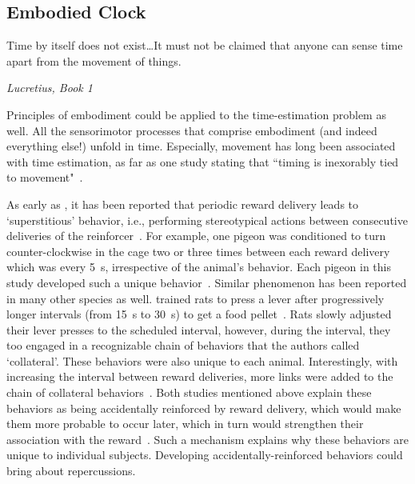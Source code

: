 \subsection{Embodied Clock}
\label{ch:intro:EmbodiedClock}
\epigraph{Time by itself does not exist\ldots It must not be claimed that anyone can sense time apart from the movement of things.}
{\textit{Lucretius, Book 1}}
\noindent
Principles of embodiment could be applied to the time-estimation problem as well.
All the sensorimotor processes that comprise embodiment (and indeed everything else!) unfold in time.
Especially, movement has long been associated with time estimation, as far as one study stating that ``timing is inexorably tied to movement"~\cite{Wiener2019eNeuro}.\footnotemark
{}
\par
As early as \citeyear{Skinner1948}, it has been reported that periodic reward delivery leads to `superstitious' behavior, i.e., performing stereotypical actions between consecutive deliveries of the reinforcer~\cite{Skinner1948}.
For example, one pigeon was conditioned to turn counter-clockwise in the cage two or three times between each reward delivery which was every 5~s, irrespective of the animal's behavior.
Each pigeon in this study developed such a unique behavior~\cite{Skinner1948}.
Similar phenomenon has been reported in many other species as well.
 trained rats to press a lever after progressively longer intervals (from 15~s to 30~s) to get a food pellet~\cite{Wilson1953}.
Rats slowly adjusted their lever presses to the scheduled interval, however, during the interval, they too engaged in a recognizable chain of behaviors that the authors called `collateral'.
These behaviors were also unique to each animal.
Interestingly, with increasing the interval between reward deliveries, more links were added to the chain of collateral behaviors~\cite{Wilson1953}.
Both studies mentioned above explain these behaviors as being accidentally reinforced by reward delivery, which would make them more probable to occur later, which in turn would strengthen their association with the reward~\cite{Killeen1988}.
Such a mechanism explains why these behaviors are unique to individual subjects.
Developing accidentally-reinforced behaviors could bring about repercussions.
